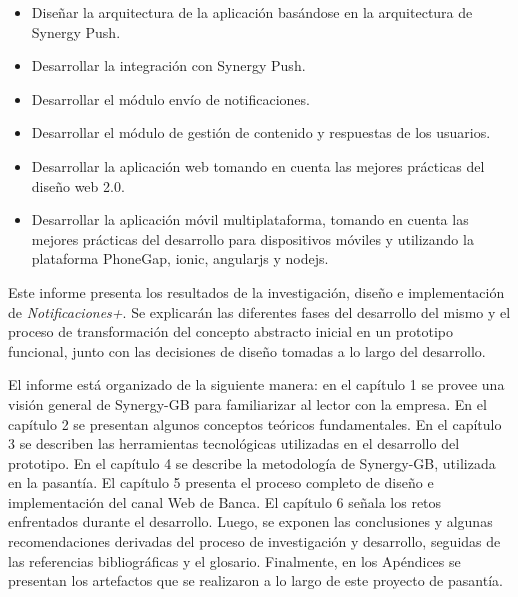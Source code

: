 \begin{itemize}[noitemsep,nolistsep]
\item Diseñar la arquitectura de la aplicación basándose en la arquitectura de Synergy Push.
\item Desarrollar la integración con Synergy Push.
\item Desarrollar el módulo envío de notificaciones.
\item Desarrollar el módulo de gestión de contenido y respuestas de los usuarios.
\item Desarrollar la aplicación web tomando en cuenta las mejores prácticas del diseño web 2.0.
\item Desarrollar la aplicación móvil multiplataforma, tomando en cuenta las mejores prácticas del desarrollo para dispositivos móviles y utilizando la plataforma PhoneGap, ionic, angularjs y nodejs.
\end{itemize}


Este informe presenta los resultados de la investigación, diseño e implementación de \textit{Notificaciones+}. Se explicarán las diferentes fases del desarrollo del mismo y el proceso de transformación del concepto abstracto inicial en un prototipo funcional, junto con las decisiones de diseño tomadas a lo largo del desarrollo.


El informe está organizado de la siguiente manera: en el capítulo 1 se provee una visión general de Synergy-GB para familiarizar al lector con la empresa. En el capítulo 2 se presentan algunos conceptos teóricos fundamentales. En el capítulo 3 se describen las herramientas tecnológicas utilizadas en el desarrollo del prototipo. En el capítulo 4 se describe la metodología de Synergy-GB, utilizada en la pasantía.  El capítulo 5 presenta el proceso completo de diseño e implementación del canal Web de Banca. El capítulo 6 señala los retos enfrentados durante el desarrollo. Luego, se exponen las conclusiones y algunas recomendaciones derivadas del proceso de investigación y desarrollo, seguidas de las referencias bibliográficas y el glosario. Finalmente, en los Apéndices se presentan los artefactos que se realizaron a lo largo de este proyecto de pasantía.

